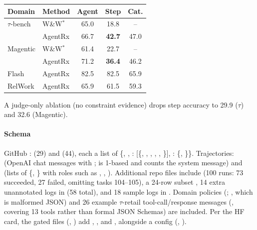 \begin{center}\small
\begin{tabular}{@{}llccc@{}}\toprule
Domain & Method & Agent & Step & Cat.\\\midrule
$\tau$-bench & W\&W$^*$ & 65.0 & 18.8 & --\\
 & AgentRx & 66.7 & \textbf{42.7} & 47.0\\
Magentic & W\&W$^*$ & 61.4 & 22.7 & --\\
 & AgentRx & 71.2 & \textbf{36.4} & 46.2\\
Flash & AgentRx & 82.5 & 82.5 & 65.9\\
RelWork & AgentRx & 65.9 & 61.5 & 59.3\\\bottomrule
\end{tabular}
\end{center}
A judge-only ablation (no constraint evidence) drops step accuracy to 29.9 ($\tau$) and 32.6 (Magentic).

\paragraph{Schema} GitHub :  (29) and  (44), each a list of \{, , : [\{, , , , , \}], : \{, \}\}. Trajectories:  (OpenAI chat messages with ;  is 1-based and counts the system message) and  (lists of \{, \} with roles such as , , ). Additional repo files include  (100 runs: 73 succeeded, 27 failed, omitting tasks 104--105), a 24-row subset , 14 extra unannotated logs in  (58 total), and 18 sample logs in . Domain policies (; , which is malformed JSON) and 26 example $\tau$-retail tool-call/response messages (, covering 13 tools rather than formal JSON Schemas) are included. Per the HF card, the gated  files (, ) add , , and , alongside a  config (, ).

